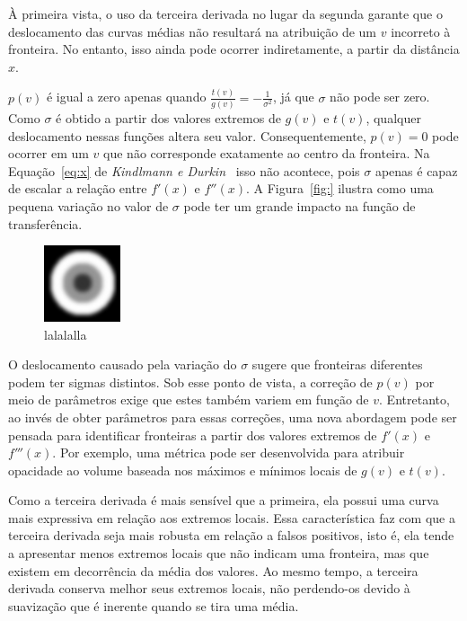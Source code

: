 	À primeira vista, o uso da terceira derivada no lugar da segunda garante que o deslocamento das curvas médias não resultará na atribuição de um $ v $ incorreto à fronteira. No entanto, isso ainda pode ocorrer indiretamente, a partir da distância $ x $. %
	
	$ p(v) $ é igual a zero apenas quando $ \frac{t(v)}{g(v)} = -\frac{1}{\sigma^{2}} $, já que $ \sigma $ não pode ser zero. Como $ \sigma $ é obtido a partir dos valores extremos de $ g(v) $ e $ t(v) $, qualquer deslocamento nessas funções altera seu valor. Consequentemente, $ p(v) = 0 $ pode ocorrer em um $ v $ que não corresponde exatamente ao centro da fronteira. Na Equação~\eqref{eq:x} de \textit{Kindlmann e Durkin}~\cite{gordon} isso não acontece, pois $ \sigma $ apenas é capaz de escalar a relação entre $ f'(x) $ e $ f''(x) $. A Figura~\ref{fig:} ilustra como uma pequena variação no valor de $ \sigma $ pode ter um grande impacto na função de transferência.
	
\begin{figure}
	\centering
	\includegraphics[width=0.2\textwidth]{images/m_triple_sphere_slice}
	\caption{lalalalla}
	\label{}
\end{figure}
	
	O deslocamento causado pela variação do $ \sigma $ sugere que fronteiras diferentes podem ter sigmas distintos. Sob esse ponto de vista, a correção de $ p(v) $ por meio de parâmetros exige que estes também variem em função de $ v $. Entretanto, ao invés de obter parâmetros para essas correções, uma nova abordagem pode ser pensada para identificar fronteiras a partir dos valores extremos de $ f'(x) $ e $ f'''(x) $. Por exemplo, uma métrica pode ser desenvolvida para atribuir opacidade ao volume baseada nos máximos e mínimos locais de $ g(v) $ e $ t(v) $.
	
	Como a terceira derivada é mais sensível que a primeira, ela possui uma curva mais expressiva em relação aos extremos locais. Essa característica faz com que a terceira derivada seja mais robusta em relação a falsos positivos, isto é, ela tende a apresentar menos extremos locais que não indicam uma fronteira, mas que existem em decorrência da média dos valores. Ao mesmo tempo, a terceira derivada conserva melhor seus extremos locais, não perdendo-os devido à suavização que é inerente quando se tira uma média.
	
